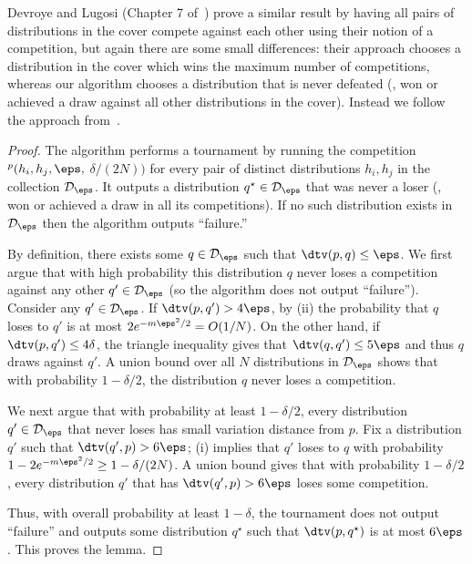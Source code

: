 Devroye and Lugosi (Chapter 7 of~\cite{DL:01}) prove a similar result by having all pairs
of distributions in the cover compete against each other using their notion of a competition, but again there
are some small differences:  their approach chooses a distribution in the cover which wins the
maximum number of competitions, whereas our algorithm chooses
a distribution that is never defeated (\ie, won or achieved a draw against all other distributions
in the cover).  Instead we follow the approach from~\cite{DDS12stoclong}.

\medskip

\begin{proof}
The algorithm %
performs a tournament by running the competition
$^p(h_i,h_j,\eps,$ $\delta/(2N))$ for every pair of distinct distributions
$h_i,h_j$ in the collection ${\cal D}_\eps$.  It outputs a distribution $q^{\star} \in {\cal D}_\eps$
that was never a loser (\ie, won or achieved a draw in all its competitions).
If no such distribution exists in ${\cal D}_\eps$ then the algorithm outputs
``failure.''

By definition, there exists some $q \in {\cal D}_\eps$ such that $\dtv(p,q) \leq \eps$.
We first argue that with high probability this distribution $q$ never
loses a competition against any other $q' \in {\cal D}_\eps$
(so the algorithm does not output ``failure'').  Consider any $q'
\in {\cal D}_\eps$. If $\dtv(p, q') > 4 \eps$, by (ii) the probability that $q$ loses to
$q'$ is at most $2e^{-m \eps^2 /2} = O(1/N)$. On the other hand, if $\dtv(p, q') \leq 4 \delta$, the triangle
inequality gives that $\dtv(q,q') \leq 5 \eps$ and thus $q$ draws against $q'$.  A union
bound over all $N$ distributions in ${\cal D}_{\eps}$ shows that with probability $1-\delta/2$, the distribution $q$ never loses a competition.

We next argue that with probability at least $1-\delta/2$, every distribution $q' \in {\cal D}_\eps$ that never loses has small variation distance from $p$. Fix a distribution $q'$ such that $\dtv(q',p) > 6 \eps$; (i) implies that $q'$ loses to $q$ with probability $1 - 2e^{-m \eps^2 /2} \geq 1 - \delta/(2N)$.  A union bound gives that with probability $1-\delta/2$, every distribution $q'$ that has $\dtv(q', p) > 6 \eps$ loses some competition.

Thus, with overall probability at least $1-\delta$, the tournament does not output ``failure'' and outputs some distribution $q^{\star}$ such that $\dtv(p, q^{\star})$ is at most $6 \eps$.
This proves the lemma.
\end{proof}


